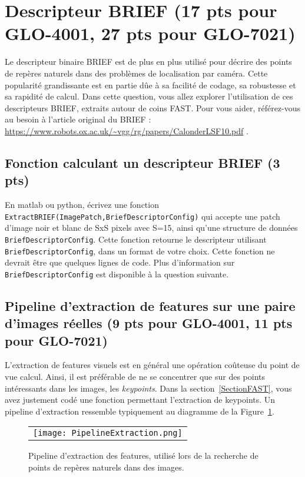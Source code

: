 \documentclass[12pt]{article}
\begin{document}

\newpage
\section{Descripteur BRIEF (17 pts pour GLO-4001, 27 pts pour GLO-7021)}
Le descripteur binaire BRIEF est de plus en plus utilisé pour décrire des points de repères naturels dans des problèmes de localisation par caméra. Cette popularité grandissante est en partie dûe à sa facilité de codage, sa robustesse et sa rapidité de calcul. Dans cette question, vous allez explorer l'utilisation de ces descripteurs BRIEF, extraits autour de coins FAST. Pour vous aider, référez-vous au besoin à l'article original du BRIEF : \url{https://www.robots.ox.ac.uk/~vgg/rg/papers/CalonderLSF10.pdf} .

\subsection{Fonction calculant un descripteur BRIEF (3 pts)}
En matlab ou python, écrivez une fonction \texttt{ExtractBRIEF(ImagePatch,BriefDescriptorConfig)} qui accepte une patch d'image noir et blanc de SxS pixels avec S=15, ainsi qu'une structure de données \texttt{BriefDescriptorConfig}. Cette fonction retourne le descripteur utilisant \texttt{BriefDescriptorConfig}, dans un format de votre choix. Cette fonction ne devrait être que quelques lignes de code. Plus d'information sur \texttt{BriefDescriptorConfig} est disponible à la question suivante.

\subsection{Pipeline d'extraction de features sur une paire d'images réelles (9 pts pour GLO-4001, 11 pts pour GLO-7021)}
L'extraction de features visuels est en général une opération coûteuse du point de vue calcul. Ainsi, il est préférable de ne se concentrer que sur des points intéressants dans les images, les \emph{keypoints}. Dans la section~\ref{SectionFAST}, vous avez justement codé une fonction permettant l'extraction de keypoints. Un pipeline d'extraction ressemble typiquement au diagramme de la Figure~\ref{PipelineExtraction}.

\begin{figure}[ht]
 \begin{center}
  \begin{tabular}{c}
    \texttt{[image: PipelineExtraction.png]} 
  \end{tabular}
 \end{center}
\vspace{-0.25in}
 \caption{Pipeline d'extraction des features, utilisé lors de la recherche de points de repères naturels dans des images.}
 \label{PipelineExtraction}
\end{figure}
\end{document}
